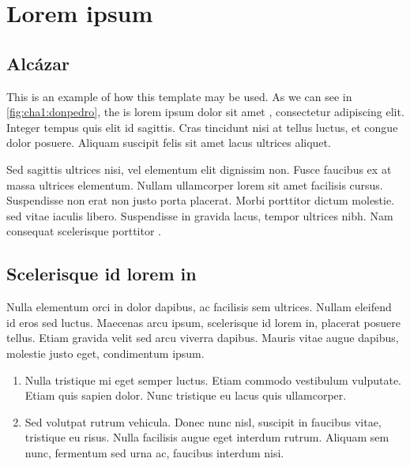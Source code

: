 % 
% 
% 



\clearpage
\cleardoublepage

\chapter{Lorem ipsum}

\section{Alcázar}

This is an example of how this template may be used. As we can see in \autoref{fig:cha1:donpedro}, the  is lorem ipsum dolor sit amet  \cite{ESP32_DATASHEET}, consectetur adipiscing elit. Integer tempus quis elit id sagittis. Cras tincidunt nisi at tellus luctus, et congue dolor posuere. Aliquam suscipit felis sit amet lacus ultrices aliquet. 

Sed sagittis ultrices nisi, vel elementum elit dignissim non. Fusce faucibus ex at massa ultrices elementum. Nullam ullamcorper lorem sit amet facilisis cursus. Suspendisse non erat non justo porta placerat. Morbi porttitor dictum molestie.  sed vitae iaculis libero. Suspendisse in gravida lacus, tempor ultrices nibh. Nam consequat scelerisque porttitor \cite{SOLDERDEFECTS}.


\section{Scelerisque id lorem in}


Nulla elementum orci in dolor dapibus, ac facilisis sem ultrices. Nullam eleifend id eros sed luctus. Maecenas arcu ipsum, scelerisque id lorem in, placerat posuere tellus. Etiam gravida velit sed arcu viverra dapibus. Mauris vitae augue dapibus, molestie justo eget, condimentum ipsum. 

\begin{enumerate}
    \item Nulla tristique mi eget semper luctus. Etiam commodo vestibulum vulputate. Etiam quis sapien dolor. Nunc tristique eu lacus quis ullamcorper. 
    \item Sed volutpat rutrum vehicula. Donec nunc nisl, suscipit in faucibus vitae, tristique eu risus. Nulla facilisis augue eget interdum rutrum. Aliquam sem nunc, fermentum sed urna ac, faucibus interdum nisi.
\end{enumerate}



